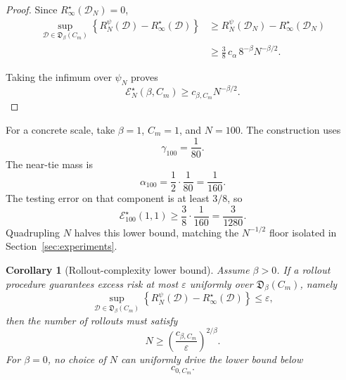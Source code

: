 \documentclass{article} %
\newtheorem{corollary}[theorem]{Corollary}
\providecommand{\D}{\mathcal{D}}
\providecommand{\Risk}{R}
\begin{document}
\begin{proof}
Since \(\Risk_\infty^\star(\D_N)=0\),
\begin{align}
\sup_{\D\in\mathfrak D_\beta(C_m)}
\left\{
\Risk_N^\psi(\D)-\Risk_\infty^\star(\D)
\right\}
&\ge
\Risk_N^\psi(\D_N)-\Risk_\infty^\star(\D_N)
\label{eq:thm3-proof-sup-a}
\\
&\ge
\frac38\,c_\alpha\,8^{-\beta}N^{-\beta/2}.
\label{eq:thm3-proof-sup-b}
\end{align}

Taking the infimum over \(\psi_N\) proves
\begin{equation}
\label{eq:thm3-proof-final}
\mathcal E_N^\star(\beta,C_m)
\ge
c_{\beta,C_m}N^{-\beta/2}.
\end{equation}
\end{proof}

For a concrete scale, take \(\beta=1\), \(C_m=1\), and \(N=100\).  The construction uses
\begin{equation}
\label{eq:thm3-example-gamma}
\gamma_{100}=\frac{1}{80}.
\end{equation}
The near-tie mass is
\begin{equation}
\label{eq:thm3-example-alpha}
\alpha_{100}=\frac12\cdot\frac{1}{80}=\frac{1}{160}.
\end{equation}
The testing error on that component is at least \(3/8\), so
\begin{equation}
\label{eq:thm3-example-risk}
\mathcal E_{100}^\star(1,1)
\ge
\frac{3}{8}\cdot\frac{1}{160}
=
\frac{3}{1280}.
\end{equation}
Quadrupling \(N\) halves this lower bound, matching the \(N^{-1/2}\) floor
isolated in Section~\ref{sec:experiments}.

\begin{corollary}[Rollout-complexity lower bound]
\label{cor:app3-rollout}
Assume \(\beta>0\).  If a rollout procedure guarantees excess risk at most
\(\varepsilon\) uniformly over \(\mathfrak D_\beta(C_m)\), namely
\begin{equation}
\label{eq:rollout-guarantee}
\sup_{\D\in\mathfrak D_\beta(C_m)}
\left\{
\Risk_N^\psi(\D)-\Risk_\infty^\star(\D)
\right\}
\le
\varepsilon,
\end{equation}
then the number of rollouts must satisfy
\begin{equation}
\label{eq:rollout-lower}
N
\ge
\left(\frac{c_{\beta,C_m}}{\varepsilon}\right)^{2/\beta}.
\end{equation}
For \(\beta=0\), no choice of \(N\) can uniformly drive the lower bound below
\begin{equation}
\label{eq:rollout-beta-zero}
c_{0,C_m}.
\end{equation}
\end{corollary}
\end{document}
